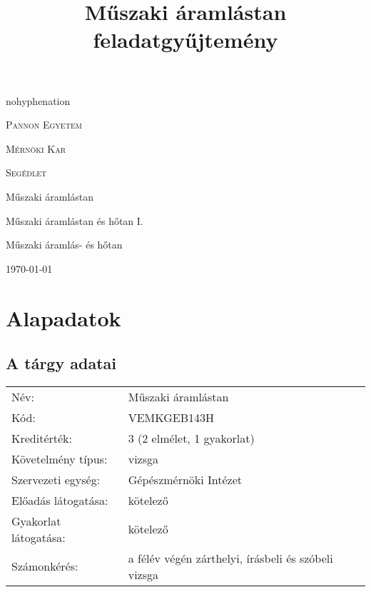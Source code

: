 \documentclass[11pt, a4paper]{report}
\author{}
\title{Műszaki áramlástan feladatgyűjtemény}
\begin{document}
\begin{titlepage}
	\centering
	\begin{hyphenrules}{nohyphenation}
		{\scshape\LARGE Pannon Egyetem \par}
		{\scshape\LARGE Mérnöki Kar \par}
		\vspace{1cm}
		{\scshape\Large Segédlet\par}
		\vspace{1.5cm}
		\parbox{8cm}{{\centering\huge\bfseries{\JakiTitle} \par}}
		\vspace{2cm}
		{\Large\itshape\JakiAuthor\par}
		\vfill
		Műszaki áramlástan \par
		Műszaki áramlástan és hőtan I.\par
		Műszaki áramlás- és hőtan

		\vfill

		{\large \today\par}
	\end{hyphenrules}
\end{titlepage}

\tableofcontents


\chapter*{Alapadatok}

\section*{A tárgy adatai}

\begin{tabular}{ l l }
Név: & Műszaki áramlástan \\
Kód: & VEMKGEB143H \\
Kreditérték: & 3 (2 elmélet, 1 gyakorlat) \\
Követelmény típus: & vizsga \\
Szervezeti egység: & Gépészmérnöki Intézet \\
Előadás látogatása: & kötelező \\
Gyakorlat látogatása: & kötelező \\
Számonkérés: & a félév végén zárthelyi, írásbeli és szóbeli vizsga \\
\end{tabular}
\end{document}
